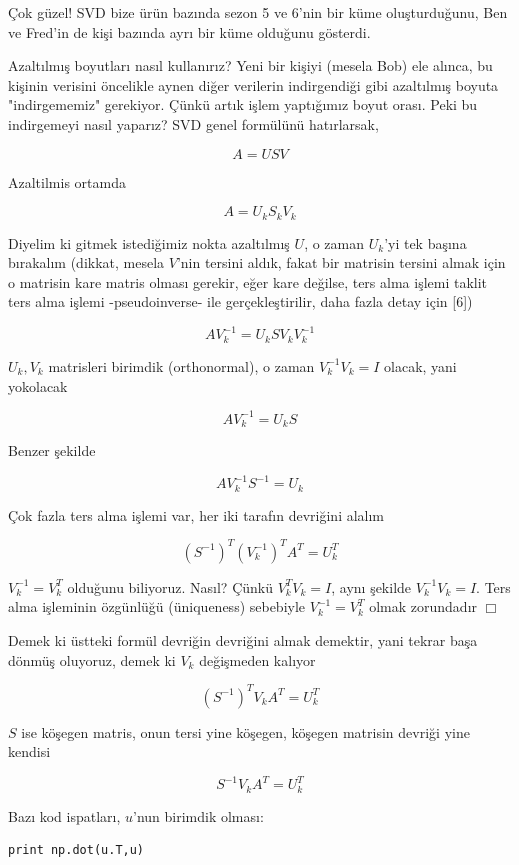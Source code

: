 \documentclass[12pt,fleqn]{article}\usepackage{../../common}
\begin{document}
Çok güzel! SVD bize ürün bazında sezon 5 ve 6'nin bir küme
oluşturduğunu, Ben ve Fred'in de kişi bazında ayrı bir küme olduğunu
gösterdi.

Azaltılmış boyutları nasıl kullanırız? Yeni bir kişiyi (mesela Bob)
ele alınca, bu kişinin verisini öncelikle aynen diğer verilerin
indirgendiği gibi azaltılmış boyuta "indirgememiz" gerekiyor. Çünkü
artık işlem yaptığımız boyut orası. Peki bu indirgemeyi nasıl yaparız?
SVD genel formülünü hatırlarsak,

$$ A = USV $$

Azaltilmis ortamda

$$ A = U_k S_k V_k $$

Diyelim ki gitmek istediğimiz nokta azaltılmış $U$, o zaman $U_k$'yi tek
başına bırakalım (dikkat, mesela $V$'nin tersini aldık, fakat bir matrisin
tersini almak için o matrisin kare matris olması gerekir, eğer kare
değilse, ters alma işlemi taklit ters alma işlemi -pseudoinverse- ile
gerçekleştirilir, daha fazla detay için [6])

$$ A V_k^{-1} = U_k S V_k V_k^{-1} $$

$U_k,V_k$ matrisleri birimdik (orthonormal), o zaman $V_k^{-1}V_k = I$
olacak, yani yokolacak

$$ A V_k^{-1} = U_k S  $$

Benzer şekilde

$$  A V_k^{-1} S^{-1} = U_k $$

Çok fazla ters alma işlemi var, her iki tarafın devriğini alalım

$$ (S^{-1})^T (V_k^{-1})^T A^T = U_k^T $$

$V_k^{-1} = V_k^T$ olduğunu biliyoruz. Nasıl? Çünkü $ V_k^TV_k = I $, aynı
şekilde $ V_k^{-1}V_k = I $. Ters alma işleminin özgünlüğü (üniqueness)
sebebiyle $V_k^{-1} = V_k^T$ olmak zorundadır $\Box$

Demek ki üstteki formül devriğin devriğini almak demektir, yani tekrar başa
dönmüş oluyoruz, demek ki $V_k$ değişmeden kalıyor

$$ (S^{-1})^T V_k A^T = U_k^T $$

$S$ ise köşegen matris, onun tersi yine köşegen, köşegen matrisin devriği
yine kendisi

$$ S^{-1} V_k A^T = U_k^T $$

Bazı kod ispatları, $u$'nun birimdik olması:

\begin{verbatim}
print np.dot(u.T,u)
\end{verbatim}
\end{document}
